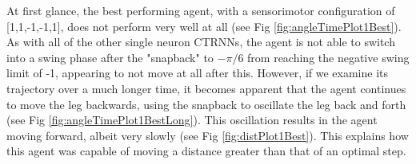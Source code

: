 \documentclass{article}
\begin{document}
At first glance, the best performing agent, with a sensorimotor configuration of [1,1,-1,-1,1], does not perform very well at all (see Fig \ref{fig:angleTimePlot1Best}). As with all of the other single neuron CTRNNs, the agent is not able to switch into a swing phase after the "snapback" to \(-\pi/6\) from reaching the negative swing limit of -1, appearing to not move at all after this. However, if we examine its trajectory over a much longer time, it becomes apparent that the agent continues to move the leg backwards, using the snapback to oscillate the leg back and forth (see Fig \ref{fig:angleTimePlot1BestLong}). This oscillation results in the agent moving forward, albeit very slowly (see Fig \ref{fig:distPlot1Best}). This explains how this agent was capable of moving a distance greater than that of an optimal step.
\end{document}
